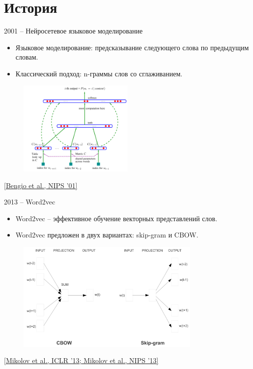 \section{История}
\begin{frame}[c]{2001 -- Нейросетевое языковое моделирование} 
\begin{itemize}
	[square]
	\item Языковое моделирование: предсказывание следующего слова по предыдущим словам.
	\item Классический подход: n-граммы слов со сглаживанием.
\end{itemize}
 \begin{figure}
 	\centering
 	\includegraphics[width=0.5\textwidth]{figures/lm_bengio_2003.png}
 \end{figure}
\let\thefootnote\footnote{\href{https://papers.nips.cc/paper/1839-a-neural-probabilistic-language-model.pdf}{\color[rgb]{0.5,0.5,0.5} [Bengio et al., NIPS ’01]}}
\end{frame}


\begin{frame}[c]{2013 -- Word2vec}
\begin{itemize}
	[square]
	\item Word2vec -- эффективное обучение векторных представлений слов. 
	\item Word2vec предложен в двух вариантах: skip-gram и CBOW.
\end{itemize}
\begin{figure}
	\centering
	\includegraphics[width=0.8\textwidth]{figures/cbow_skipgram_mikolov_2013.png}
\end{figure}
\let\thefootnote\footnote{\href{http://arxiv.org/abs/1301.3781}{\color[rgb]{0.5,0.5,0.5} [Mikolov et al., ICLR ’13; Mikolov et al., NIPS ’13]}}
\end{frame}

